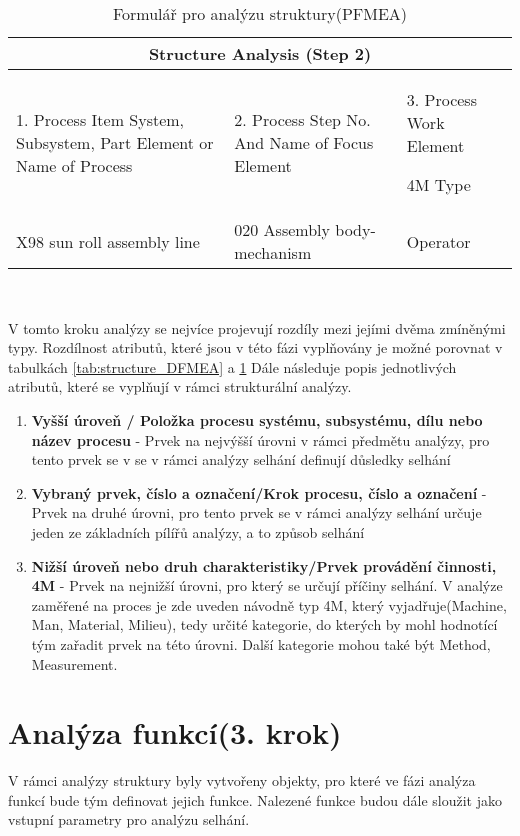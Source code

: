 \begin{center}
\begin{table}[h]
	\centering
	\caption{Formulář pro analýzu struktury(PFMEA) }
	\label{tab:structure_PFMEA}
\begin{tabular}{ |p{4cm}|p{3cm}|p{3cm}|  }
 \hline
 \multicolumn{3}{|c|}{Structure Analysis (Step 2)} \\
 \hline
1. Process Item
System, Subsystem, Part Element or Name of Process
& 2. Process Step
No. And Name of Focus Element
&3. Process Work Element

4M Type\\
 \hline
X98 sun roll assembly line   & 020 Assembly body-mechanism   &Operator\\


 \hline
\end{tabular}\  
\end{table}
\end{center}

V tomto kroku analýzy se nejvíce projevují rozdíly mezi jejími dvěma zmíněnými typy. Rozdílnost atributů, které jsou v této fázi vyplňovány je možné porovnat v tabulkách \ref{tab:structure_DFMEA} a  \ref{tab:structure_PFMEA} 
Dále následuje popis jednotlivých atributů, které se vyplňují v rámci strukturální analýzy. 

\begin{enumerate}
	\item \textbf{Vyšší úroveň / Položka procesu systému, subsystému, dílu nebo název procesu} - Prvek na nejvýšší úrovni v rámci předmětu analýzy, pro tento prvek se v se v rámci analýzy selhání definují důsledky selhání
	\item \textbf{Vybraný prvek, číslo a označení/Krok procesu, číslo a označení} - Prvek na druhé úrovni, pro tento prvek se v rámci analýzy selhání určuje jeden ze základních pílířů analýzy, a to způsob selhání
	\item \textbf{Nižší úroveň nebo druh charakteristiky/Prvek provádění činnosti, 4M} - Prvek na nejnižší úrovni, pro který se určují příčiny selhání. V analýze zaměřené na proces je zde uveden návodně typ 4M, který vyjadřuje(Machine, Man, Material, Milieu), tedy určité kategorie, do kterých by mohl hodnotící tým zařadit prvek na této úrovni. Další kategorie mohou také být Method, Measurement.  
\end{enumerate}

\section{Analýza funkcí(3. krok)}
\label{sec:FMEA_postup_3}
V rámci analýzy struktury byly vytvořeny objekty, pro které ve fázi analýza funkcí bude tým definovat jejich funkce. Nalezené funkce budou dále sloužit jako vstupní parametry pro analýzu selhání. 

